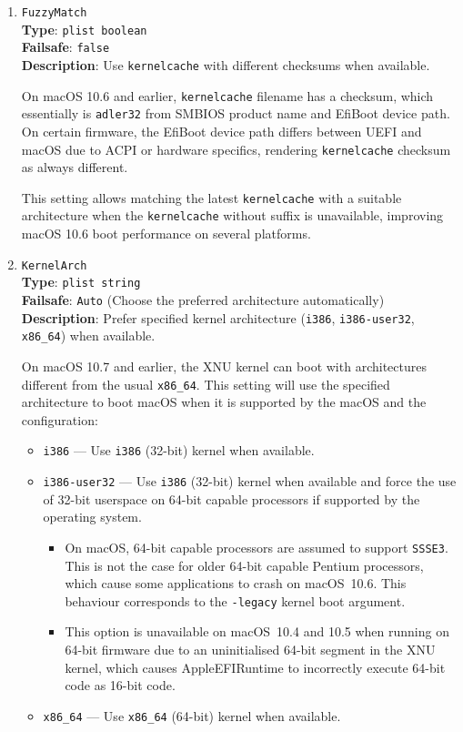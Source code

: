 \documentclass[]{article}
\providecommand{\tightlist}{%
  \setlength{\itemsep}{0pt}\setlength{\parskip}{0pt}}
\begin{document}
\begin{enumerate}

\item
  \texttt{FuzzyMatch}\\
  \textbf{Type}: \texttt{plist\ boolean}\\
  \textbf{Failsafe}: \texttt{false}\\
  \textbf{Description}: Use \texttt{kernelcache} with different checksums when available.

  On macOS 10.6 and earlier, \texttt{kernelcache} filename has a checksum, which essentially
  is \texttt{adler32} from SMBIOS product name and EfiBoot device path. On certain firmware,
  the EfiBoot device path differs between UEFI and macOS due to ACPI or hardware specifics,
  rendering \texttt{kernelcache} checksum as always different.

  This setting allows matching the latest \texttt{kernelcache} with a suitable architecture
  when the \texttt{kernelcache} without suffix is unavailable, improving macOS 10.6 boot
  performance on several platforms.

\item
  \texttt{KernelArch}\\
  \textbf{Type}: \texttt{plist\ string}\\
  \textbf{Failsafe}: \texttt{Auto} (Choose the preferred architecture automatically)\\
  \textbf{Description}: Prefer specified kernel architecture (\texttt{i386},
  \texttt{i386-user32}, \texttt{x86\_64}) when available.

  On macOS 10.7 and earlier, the XNU kernel can boot with architectures different from
  the usual \texttt{x86\_64}. This setting will use the specified architecture to boot
  macOS when it is supported by the macOS and the configuration:

  \begin{itemize}
    \tightlist
    \item \texttt{i386} --- Use \texttt{i386} (32-bit) kernel when available.
    \item \texttt{i386-user32} --- Use \texttt{i386} (32-bit) kernel when available
      and force the use of 32-bit userspace on 64-bit capable processors if supported
      by the operating system.
      \begin{itemize}
        \tightlist
        \item On macOS, 64-bit capable processors are assumed to
          support \texttt{SSSE3}. This is not the case for older 64-bit capable Pentium
          processors, which cause some applications to crash on macOS~10.6. This behaviour
          corresponds to the \texttt{-legacy} kernel boot argument.
        \item This option is unavailable on macOS~10.4 and 10.5 when running on 64-bit firmware
          due to an uninitialised 64-bit segment in the XNU kernel, which causes AppleEFIRuntime
          to incorrectly execute 64-bit code as 16-bit code.
      \end{itemize}
    \item \texttt{x86\_64} --- Use \texttt{x86\_64} (64-bit) kernel when available.
  \end{itemize}


\end{enumerate}
\end{document}
